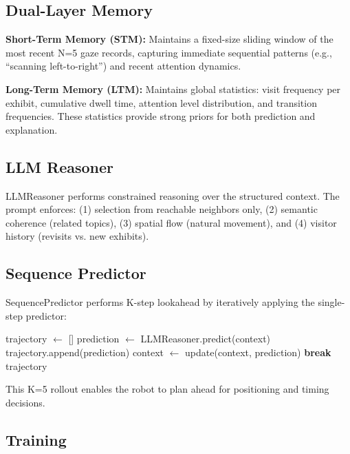 \documentclass[letterpaper]{article}
\begin{document}
\subsection{Dual-Layer Memory}

\textbf{Short-Term Memory (STM):} Maintains a fixed-size sliding window of the most recent N=5 gaze records, capturing immediate sequential patterns (e.g., ``scanning left-to-right'') and recent attention dynamics.

\textbf{Long-Term Memory (LTM):} Maintains global statistics: visit frequency per exhibit, cumulative dwell time, attention level distribution, and transition frequencies. These statistics provide strong priors for both prediction and explanation.

\subsection{LLM Reasoner}

LLMReasoner performs constrained reasoning over the structured context. The prompt enforces: (1) selection from reachable neighbors only, (2) semantic coherence (related topics), (3) spatial flow (natural movement), and (4) visitor history (revisits vs. new exhibits).

\subsection{Sequence Predictor}

SequencePredictor performs K-step lookahead by iteratively applying the single-step predictor:

\begin{algorithm}[h]
\caption{K-Step Sequence Prediction}
\begin{algorithmic}[1]
\STATE trajectory $\leftarrow$ []
    \STATE prediction $\leftarrow$ LLMReasoner.predict(context)
    \STATE trajectory.append(prediction)
    \STATE context $\leftarrow$ update(context, prediction)
     \textbf{break} \ENDIF
\ENDFOR
\RETURN trajectory
\end{algorithmic}
\end{algorithm}

This K=5 rollout enables the robot to plan ahead for positioning and timing decisions.

\subsection{Training}
\end{document}
